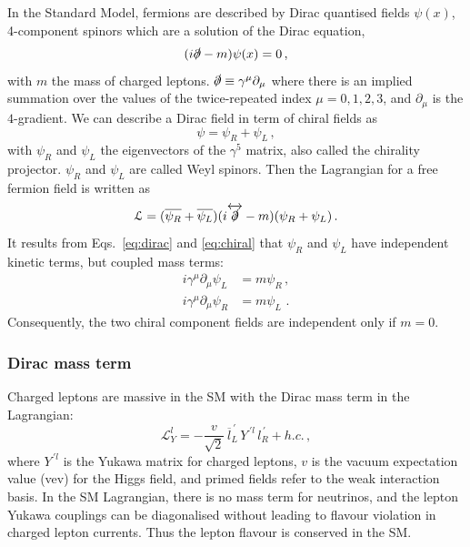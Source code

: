 In the Standard Model, fermions are described by Dirac quantised fields $\psi(x)$, 4-component spinors which are a solution of the Dirac equation,
\begin{equation}
  (i\slashed\partial-m)\psi(x)=0\,,
  \label{eq:dirac}
\end{equation}
with $m$ the mass of charged leptons.
$\slashed\partial\equiv \gamma^{\mu}\partial_{\mu}$ where there is an implied summation over the values of the twice-repeated index $\mu=0,1,2,3$, and $\partial_{\mu}$ is the $4$-gradient.
We can describe a Dirac field in term of chiral fields as
\begin{equation}
  \psi = \psi_R + \psi_L\,,
  \label{eq:chiral}
\end{equation}
with $\psi_R$ and $\psi_L$ the eigenvectors of the $\gamma^{5}$ matrix, also called the chirality projector.
$\psi_R$ and $\psi_L$ are called Weyl spinors.
Then the Lagrangian for a free fermion field is written as
\begin{equation}
\mathcal{L} = (\overline{\psi_R} + \overline{\psi_L})(i\overleftrightarrow{\slashed{\partial}}-m)(\psi_R + \psi_L)\,.
\end{equation}
It results from Eqs.~\eqref{eq:dirac} and \eqref{eq:chiral} that $\psi_R$ and $\psi_L$ have independent kinetic terms, but coupled mass terms:
\begin{align}
i\gamma^{\mu}\partial_{\mu}\psi_L& = m\psi_R\,,\label{eq:psi_L}\\
i\gamma^{\mu}\partial_{\mu}\psi_R& = m\psi_L\,\label{eq:psi_R}\,.
\end{align}
Consequently, the two chiral component fields are independent only if $m = 0$.

\subsubsection*{Dirac mass term}

Charged leptons are massive in the SM with the Dirac mass term in the Lagrangian:
\begin{equation}
\mathcal{L}^{l}_{Y} = -\frac{v}{\sqrt{2}}\,\overline{l}^{\,'}_{L}\,Y^{\,'l}\,l^{\,'}_{R} + h.c.\,,
\end{equation}
where $Y^{\,'l}$ is the Yukawa matrix for charged leptons, $v$ is the vacuum expectation value (vev) for the Higgs field, and primed fields refer to the weak interaction basis.
In the SM Lagrangian, there is no mass term for neutrinos, and the lepton Yukawa couplings can be diagonalised without leading to flavour violation in charged lepton currents.
Thus the lepton flavour is conserved in the SM.

